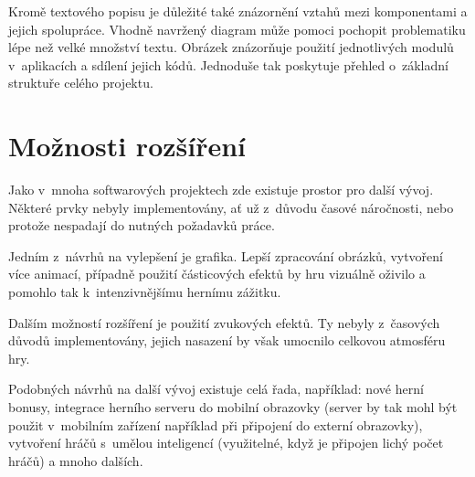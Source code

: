 \documentclass[thesis=B,czech,hidelinks]{FITthesis}[2012/06/26] %
\begin{document}
Kromě textového popisu je důležité také znázornění vztahů mezi komponentami a jejich spolupráce. Vhodně navržený diagram může pomoci pochopit problematiku lépe než velké množství textu. Obrázek  znázorňuje použití jednotlivých modulů v~aplikacích a sdílení jejich kódů.  Jednoduše tak poskytuje přehled o~základní struktuře celého projektu. 

\section{Možnosti rozšíření}

Jako v~mnoha softwarových projektech zde existuje prostor pro další vývoj. Některé prvky nebyly implementovány, ať už z~důvodu časové náročnosti, nebo protože nespadají do nutných požadavků práce.

Jedním z~návrhů na vylepšení je grafika. Lepší zpracování obrázků, vytvoření více animací, případně použití částicových efektů by hru vizuálně oživilo a pomohlo tak k~intenzivnějšímu hernímu zážitku.

Dalším možností rozšíření je použití zvukových efektů. Ty nebyly z~časových důvodů implementovány, jejich nasazení by však umocnilo celkovou atmosféru hry.

Podobných návrhů na další vývoj existuje celá řada, například: nové herní bonusy, integrace herního serveru do mobilní obrazovky (server by tak mohl být použit v~mobilním zařízení například při připojení do externí obrazovky), vytvoření hráčů s~umělou inteligencí (využitelné, když je připojen lichý počet hráčů) a mnoho dalších.
\end{document}

